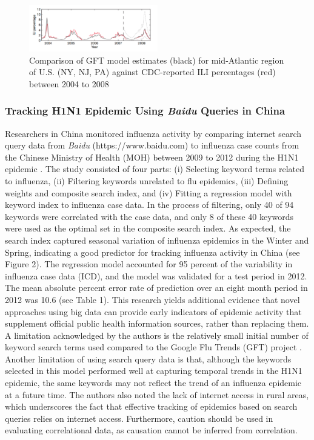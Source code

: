 \documentclass[sigconf]{acmart}
\begin{document}
\begin{figure}
  \centering
  \includegraphics[width=0.5\textwidth]{images/Figure1.pdf}
  \caption{Comparison of GFT model estimates (black) for mid-Atlantic region of U.S. 
  (NY, NJ, PA) against CDC-reported ILI percentages (red) between 2004 to 2008 
  \cite{ginsburg09}} 
  \label{fig:Figure1} 
\end{figure}

\subsubsection{Tracking H1N1 Epidemic Using {\itshape Baidu} Queries in China}

Researchers in China monitored influenza activity by comparing internet search query 
data from {\it Baidu} (https://www.baidu.com) to influenza case counts from the Chinese 
Ministry of Health (MOH) between 2009 to 2012 during the H1N1 epidemic \cite{yuan13}. 
The study consisted of four parts: (i) Selecting keyword terms related to influenza, (ii) 
Filtering keywords unrelated to flu epidemics, (iii) Defining weights and composite search 
index, and (iv) Fitting a regression model with keyword index to influenza case data. In the 
process of filtering, only 40 of 94 keywords were correlated with the case data, and only 8 
of these 40 keywords were used as the optimal set in the composite search index. As expected,
the search index captured seasonal variation of influenza epidemics in the Winter and Spring,
indicating a good predictor for tracking influenza activity in China (see Figure 2). The 
regression model accounted for 95 percent of the variability in influenza case data (ICD), 
and the model was validated for a test period in 2012. The mean absolute percent error rate 
of prediction over an eight month period in 2012 was 10.6 (see Table 1). This research yields 
additional evidence that novel approaches using big data can provide early indicators of 
epidemic activity that supplement official public health information sources, rather than 
replacing them. A limitation acknowledged by the authors is the relatively small initial 
number of keyword search terms used compared to the Google Flu Trends (GFT) project 
\cite{ginsburg09}. Another limitation of using search query data is that, although the 
keywords selected in this model performed well at capturing temporal trends in the H1N1 
epidemic, the same keywords may not reflect the trend of an influenza epidemic at a future 
time. The authors also noted the lack of internet access in rural areas, which underscores 
the fact that effective tracking of epidemics based on search queries relies on internet 
access. Furthermore, caution should be used in evaluating correlational data, as causation 
cannot be inferred from correlation.
\end{document}
